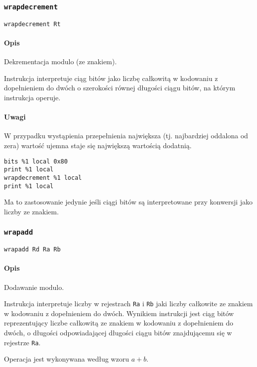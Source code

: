 \subsubsection{\texttt{wrapdecrement}}

\begin{lstlisting}
wrapdecrement Rt
\end{lstlisting}

\paragraph*{Opis} Dekrementacja modulo (ze znakiem).

Instrukcja interpretuje ciąg bitów jako liczbę całkowitą w kodowaniu z
dopełnieniem do dwóch o szerokości równej długości ciągu bitów, na którym
instrukcja operuje.

\paragraph*{Uwagi}

W przypadku wystąpienia przepełnienia największa (tj. najbardziej oddalona od
zera) wartość ujemna staje się największą wartością dodatnią.
\begin{lstlisting}
bits %1 local 0x80
print %1 local
wrapdecrement %1 local
print %1 local
\end{lstlisting}
Ma to zastosowanie jedynie jeśli ciągi bitów są interpretowane przy konwersji
jako liczby ze znakiem.

\subsubsection{\texttt{wrapadd}}

\begin{lstlisting}
wrapadd Rd Ra Rb
\end{lstlisting}

\paragraph*{Opis} Dodawanie modulo.

Instrukcja interpretuje liczby w rejestrach \texttt{Ra} i \texttt{Rb} jaki
liczby całkowite ze znakiem w kodowaniu z dopełnieniem do dwóch. Wynikiem
instrukcji jest ciąg bitów reprezentujący liczbe całkowitą ze znakiem w
kodowaniu z dopełnieniem do dwóch, o długości odpowiadającej długości ciągu
bitów znajdującemu się w rejestrze \texttt{Ra}.

Operacja jest wykonywana według wzoru $a + b$.

